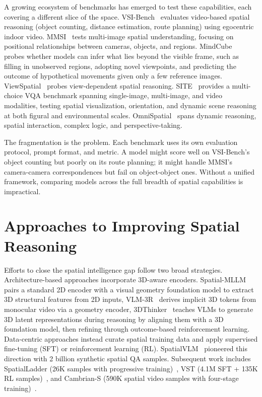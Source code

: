 A growing ecosystem of benchmarks has emerged to test these capabilities, each covering a different slice of the space. VSI-Bench~\cite{yang2025thinkingspacemultimodallarge} evaluates video-based spatial reasoning (object counting, distance estimation, route planning) using egocentric indoor video. MMSI~\cite{yang2025mmsibenchbenchmarkmultiimagespatial} tests multi-image spatial understanding, focusing on positional relationships between cameras, objects, and regions. MindCube~\cite{yin2025spatialmentalmodelinglimited} probes whether models can infer what lies beyond the visible frame, such as filling in unobserved regions, adopting novel viewpoints, and predicting the outcome of hypothetical movements given only a few reference images. ViewSpatial~\cite{li2025viewspatialbenchevaluatingmultiperspectivespatial} probes view-dependent spatial reasoning. SITE~\cite{wang2025sitespatialintelligencethorough} provides a multi-choice VQA benchmark spanning single-image, multi-image, and video modalities, testing spatial visualization, orientation, and dynamic scene reasoning at both figural and environmental scales. OmniSpatial~\cite{jia2026omnispatialcomprehensivespatialreasoning} spans dynamic reasoning, spatial interaction, complex logic, and perspective-taking.

The fragmentation is the problem. Each benchmark uses its own evaluation protocol, prompt format, and metric. A model might score well on VSI-Bench's object counting but poorly on its route planning; it might handle MMSI's camera-camera correspondences but fail on object-object ones. Without a unified framework, comparing models across the full breadth of spatial capabilities is impractical.

\section{Approaches to Improving Spatial Reasoning}

Efforts to close the spatial intelligence gap follow two broad strategies. Architecture-based approaches incorporate 3D-aware encoders. Spatial-MLLM~\cite{wu2025spatialmllmboostingmllmcapabilities} pairs a standard 2D encoder with a visual geometry foundation model to extract 3D structural features from 2D inputs, VLM-3R~\cite{fan2025vlm3rvisionlanguagemodelsaugmented} derives implicit 3D tokens from monocular video via a geometry encoder, 3DThinker~\cite{chen2026think3dgeometricimagination} teaches VLMs to generate 3D latent representations during reasoning by aligning them with a 3D foundation model, then refining through outcome-based reinforcement learning. Data-centric approaches instead curate spatial training data and apply supervised fine-tuning (SFT) or reinforcement learning (RL). SpatialVLM~\cite{chen2024spatialvlmendowingvisionlanguagemodels} pioneered this direction with 2 billion synthetic spatial QA samples. Subsequent work includes SpatialLadder (26K samples with progressive training)~\cite{li2025spatialladderprogressivetrainingspatial}, VST (4.1M SFT + 135K RL samples)~\cite{yang2025visualspatialtuning}, and Cambrian-S (590K spatial video samples with four-stage training)~\cite{yang2025cambriansspatialsupersensingvideo}.

